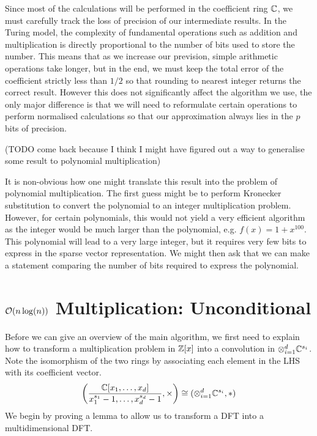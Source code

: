 Since most of the calculations will be performed in the coefficient ring ${\mathbb C}$, we must carefully track the loss of precision of our intermediate results. In the Turing model, the complexity of fundamental operations such as addition and multiplication is directly proportional to the number of bits used to store the number. This means that as we increase our prevision, simple arithmetic operations take longer, but in the end, we must keep the total error of the coefficient strictly less than $1/2$ so that rounding to nearest integer returns the correct result. However this does not significantly affect the algorithm we use, the only major difference is that we will need to reformulate certain operations to perform normalised calculations so that our approximation always lies in the $p$ bits of precision.

\medskip

(TODO come back because I think I might have figured out a way to generalise some result to polynomial multiplication)

\medskip

It is non-obvious how one might translate this result into the problem of polynomial multiplication. The first guess might be to perform Kronecker substitution to convert the polynomial to an integer multiplication problem. However, for certain polynomials, this would not yield a very efficient algorithm as the integer would be much larger than the polynomial, e.g. $f(x) = 1 + x^{100}$.\\
This polynomial will lead to a very large integer, but it requires very few bits to express in the sparse vector representation. We might then ask that we can make a statement comparing the number of bits required to express the polynomial.

\section{$\mathcal O(n\log(n))$ Multiplication: Unconditional}
\label{subsec:nlogn}

Before we can give an overview of the main algorithm, we first need to explain how to transform a multiplication problem in ${\mathbb Z}[x]$ into a convolution in $\otimes_{i=1}^{d} {\mathbb C}^{s_i}$.\\
Note the isomorphism of the two rings by associating each element in the LHS with its coefficient vector.
\[
    \left(\frac{{\mathbb C}[x_1, \ldots, x_d]}{x_1^{s_1} - 1, \ldots, x_d^{s_d} - 1}, \times\right) \cong (\otimes_{i=1}^d {\mathbb C}^{s_i}, \ast)
\]
We begin by proving a lemma to allow us to transform a DFT into a multidimensional DFT.


